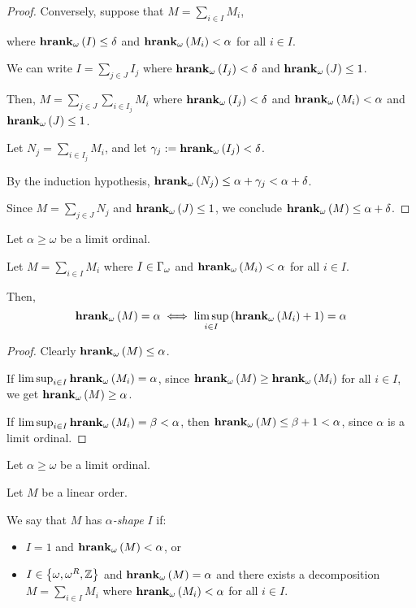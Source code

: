 \begin{proof}
  Conversely, suppose that $M = \sum_{i \in I} M_i$,
  
  where $\mathbf{hrank}_{\omega}\left( I \right) \le \delta$ and $\mathbf{hrank}_{\omega}\left( M_i \right) < \alpha$ for all $i \in I$.

  We can write $I = \sum_{j \in J} I_j$
  where $\mathbf{hrank}_{\omega}\left( I_j \right) < \delta$ and $\mathbf{hrank}_{\omega}\left( J \right) \le 1$.

  Then, $M = \sum_{j \in J} \sum_{i \in I_j} M_i$ where $\mathbf{hrank}_{\omega}\left( I_j \right) < \delta$
  and $\mathbf{hrank}_{\omega}\left( M_i \right) < \alpha$ and $\mathbf{hrank}_{\omega}\left( J \right) \le 1$.
  
  Let $N_j = \sum_{i \in I_j} M_i$, and let $\gamma_j := \mathbf{hrank}_{\omega}\left( I_j \right) < \delta$.

  By the induction hypothesis,
  $\mathbf{hrank}_{\omega}\left( N_j \right) \le \alpha + \gamma_j < \alpha + \delta$.
  
  Since $M = \sum_{j \in J} N_j$ and $\mathbf{hrank}_{\omega}\left( J \right) \le 1$,
  we conclude $\mathbf{hrank}_{\omega}\left( M \right) \le \alpha + \delta$.
\end{proof}

\begin{lemma}
  Let $\alpha \ge \omega$ be a limit ordinal.

  Let $M = \sum_{i \in I} M_i$ where $I \in \Gamma_{\omega}$ and $\mathbf{hrank}_{\omega}\left( M_i \right) < \alpha$
  for all $i \in I$.

  Then,
  $$\mathbf{hrank}_{\omega}\left( M \right) = \alpha \iff \limsup_{i \in I} \left( {\mathbf{hrank}_{\omega}\left( M_i \right)+1} \right) = \alpha$$
\end{lemma}

\begin{proof}
  Clearly $\mathbf{hrank}_{\omega}\left( M \right) \le \alpha$.
  
  If $\limsup_{i \in I}{\mathbf{hrank}_{\omega}\left( M_i \right)} = \alpha$,
  since $\mathbf{hrank}_{\omega}\left( M \right) \ge \mathbf{hrank}_{\omega}\left( M_i \right)$ for all $i \in I$,
  we get $\mathbf{hrank}_{\omega}\left( M \right) \ge \alpha$.

  If $\limsup_{i \in I}{\mathbf{hrank}_{\omega}\left( M_i \right)} = \beta < \alpha$,
  then $\mathbf{hrank}_{\omega}\left( M \right) \le \beta + 1 < \alpha$, since 
  $\alpha$ is a limit ordinal.
\end{proof}

\begin{definition}
  Let $\alpha \ge \omega$ be a limit ordinal.

  Let $M$ be a linear order.

  We say that $M$ has \emph{$\alpha$-shape} $I$ if:

  \begin{itemize}
    \item $I = 1$ and $\mathbf{hrank}_{\omega}\left( M \right) < \alpha$, or
    \item $I \in \left\{ {\omega, \omega^R, \mathbb{Z}} \right\}$ and $\mathbf{hrank}_{\omega}\left( M \right) = \alpha$ and
      there exists a decomposition $M = \sum_{i \in I} M_i$ where
      $\mathbf{hrank}_{\omega}\left( M_i \right) < \alpha$ for all $i \in I$.
  \end{itemize}
\end{definition}


